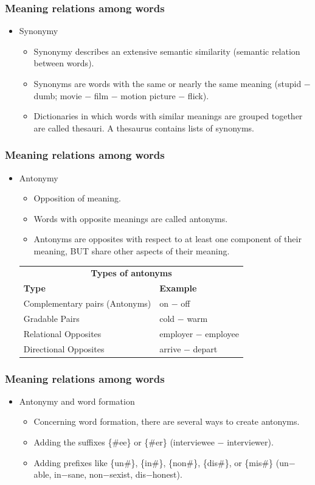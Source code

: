 \documentclass[12pt, table]{beamer}
\begin{document}
\begin{frame}
\frametitle{Meaning relations among words}
\begin{itemize}
\item Synonymy
\begin{itemize}
\item Synonymy describes an extensive semantic similarity (semantic relation between words).
\item Synonyms are words with the same or nearly the same meaning (stupid $-$ dumb; movie $-$ film $-$ motion picture $-$ flick).
\item Dictionaries in which words with similar meanings are grouped together are called thesauri. A thesaurus contains lists of synonyms.
\end{itemize}
\end{itemize}
\end{frame}

\begin{frame}
\frametitle{Meaning relations among words}
\begin{itemize}
\item Antonymy
\begin{itemize}
\item Opposition of meaning. 
\item Words with opposite meanings are called antonyms.
\item Antonyms are opposites with respect to at least one component of their meaning, BUT share other aspects of their meaning.
\end{itemize}
\footnotesize{
\begin{tabularx}{\textwidth}{ll}
\hline
\multicolumn{2}{c}{\textbf{Types of antonyms}}\\
\textbf{Type} & \textbf{Example} \\
\hline
Complementary pairs (Antonyms) & on $-$ off\\ 
Gradable Pairs & cold $-$ warm\\
Relational Opposites & employer $-$ employee\\
Directional Opposites &arrive $-$ depart\\
\hline
\end{tabularx}
}
\end{itemize}
\end{frame}

\begin{frame}
\frametitle{Meaning relations among words}
\begin{itemize}
\item Antonymy and word formation
\begin{itemize}
\item Concerning word formation, there are several ways to create antonyms.
\item Adding the suffixes \{\#ee\} or \{\#er\} (interviewee $-$ interviewer). 
\item Adding prefixes like \{un\#\}, \{in\#\}, \{non\#\}, \{dis\#\}, or \{mis\#\} (un$-$able, in$-$sane, non$-$sexist, dis$-$honest).
\end{itemize}
\end{itemize}
\end{frame}
\end{document}
